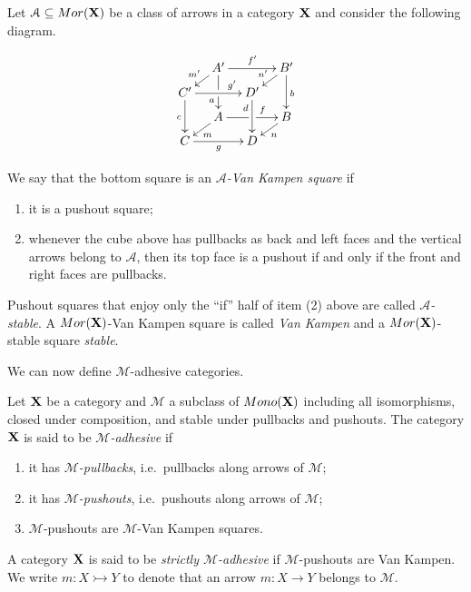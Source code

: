 \documentclass[runningheads,envcountsect]{lipics-v2021}
\def\C{\textbf {\textup{C}}}
\def\X{\textbf {\textup{X}}}
\newcommand{\mor}{\mathsf{Mor}}
\newcommand{\mon}{\mathsf{Mono}}
\newcommand{\mto}{\rightarrowtail}
\begin{document}
\begin{definition}
	Let $\mathcal{A}\subseteq \mor(\X)$ be a class of arrows in a category $\X$ and consider the following diagram.
	
		\[
	\xymatrix@C=10pt@R=6pt{&A'\ar[dd]|\hole_(.65){a}\ar[rr]^{f'} \ar[dl]_{m'} && B' \ar[dd]^{b} \ar[dl]_{n'} \\ C'  \ar[dd]_{c}\ar[rr]^(.7){g'} & & D' \ar[dd]_(.3){d}\\&A\ar[rr]|\hole^(.65){f} \ar[dl]^{m} && B \ar[dl]^{n} \\C \ar[rr]_{g} & & D }\]
	
	We say that the bottom square is an \emph{$\mathcal{A}$-Van Kampen square} if
		\begin{enumerate}
			\item it is a pushout square;
			\item 	whenever the cube above has pullbacks as back and left faces and the vertical arrows belong to $\mathcal{A}$, then its top face is a pushout 
			if and only if the front and right faces are pullbacks.
	\end{enumerate}


	Pushout squares that enjoy only the ``if'' half of item (2) above are called \emph{$\mathcal{A}$-stable}. A $\mor(\X)$-Van Kampen square is called  \emph{Van
		Kampen} and a $\mor(\X)$-stable square  \emph{stable}.
\end{definition}

We can now define $\mathcal{M}$-adhesive categories.

\begin{definition}
	Let $\X$ be a category and $\mathcal{M}$ a subclass of
	$\mon(\X)$  including  all isomorphisms, closed under composition,  and stable under pullbacks and pushouts.  The category  $\X$ is said to be \emph{$\mathcal{M}$-adhesive} if
	\begin{enumerate}
		\item it has \emph{$\mathcal{M}$-pullbacks}, i.e.~pullbacks along arrows of $\mathcal{M}$;
		\item it has \emph{$\mathcal{M}$-pushouts}, i.e.~pushouts along arrows of $\mathcal{M}$;
		\item  $\mathcal{M}$-pushouts are $\mathcal{M}$-Van Kampen squares.
	\end{enumerate}
	
	A category $\X$ is said to be \emph{strictly $\mathcal{M}$-adhesive}
	if $\mathcal{M}$-pushouts are Van Kampen. We write $m\colon X \mto Y$ to denote that an arrow $m\colon X\to Y$ belongs to $\mathcal{M}$.
\end{definition}
\end{document}
